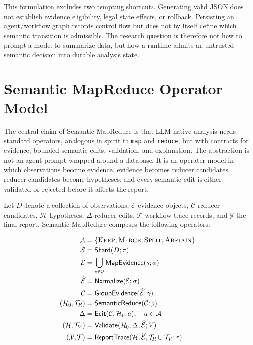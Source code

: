 \documentclass[sigplan,anonymous,nonacm]{acmart}
\newcommand{\systemname}{Semantic MapReduce}
\begin{document}
This formulation excludes two tempting shortcuts. Generating valid JSON does not establish evidence eligibility, legal state effects, or rollback. Persisting an agent/workflow graph records control flow but does not by itself define which semantic transition is admissible. The research question is therefore not how to prompt a model to summarize data, but how a runtime admits an untrusted semantic decision into durable analysis state.

\section{\systemname{} Operator Model}

The central claim of \systemname{} is that LLM-native analysis needs standard operators, analogous in spirit to \texttt{map} and \texttt{reduce}, but with contracts for evidence, bounded semantic edits, validation, and explanation. The abstraction is not an agent prompt wrapped around a database. It is an operator model in which observations become evidence, evidence becomes reducer candidates, reducer candidates become hypotheses, and every semantic edit is either validated or rejected before it affects the report.

Let $D$ denote a collection of observations, $\mathcal{E}$ evidence objects, $\mathcal{C}$ reducer candidates, $\mathcal{H}$ hypotheses, $\Delta$ reducer edits, $\mathcal{T}$ workflow trace records, and $\mathcal{Y}$ the final report. \systemname{} composes the following operators:

\begin{align}
\mathcal{A} &= \{\textsc{Keep},\textsc{Merge},\textsc{Split},\textsc{Abstain}\} \\
\mathcal{S} &= \textsf{Shard}(D;\pi) \\
\mathcal{E} &= \bigcup_{s \in \mathcal{S}} \textsf{MapEvidence}(s;\phi) \\
\widehat{\mathcal{E}} &= \textsf{Normalize}(\mathcal{E};\sigma) \\
\mathcal{C} &= \textsf{GroupEvidence}(\widehat{\mathcal{E}};\gamma) \\
(\mathcal{H}_0,\mathcal{T}_R) &= \textsf{SemanticReduce}(\mathcal{C};\rho) \\
\Delta &= \textsf{Edit}(\mathcal{C}, \mathcal{H}_0; a), \quad a \in \mathcal{A} \\
(\mathcal{H},\mathcal{T}_V) &= \textsf{Validate}(\mathcal{H}_0,\Delta,\widehat{\mathcal{E}};V) \\
(\mathcal{Y},\mathcal{T}) &= \textsf{ReportTrace}(\mathcal{H},\widehat{\mathcal{E}},\mathcal{T}_R \cup \mathcal{T}_V;\tau).
\end{align}
\end{document}
